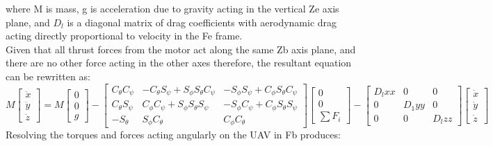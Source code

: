 \documentclass[12pt,a4paper,twoside]{report}
\begin{document}
				where M is mass, g is acceleration due to gravity acting in the vertical Ze axis plane, and \(D_l\) is a diagonal matrix of drag coefficients with aerodynamic drag acting directly proportional to velocity in the Fe frame.
				\\
				Given that all thrust forces from the motor act along the same Zb axis plane, and there are no other force acting in the other axes therefore, the resultant equation can be rewritten as:
				\\
				\begin{equation}
					M 
					\begin{bmatrix}
						\ddot{x} \\
						\ddot{y} \\
						\ddot{z}
					\end{bmatrix}
					=
					M 
					\begin{bmatrix}
						0 \\
						0 \\
						g
					\end{bmatrix}
					-
					\begin{bmatrix}
						C_\theta C_\psi & -C_\theta S_\psi + S_\phi S_\theta C_\psi & -S_\phi S_\psi + C_\phi S_\theta C_\psi \\
						C_\theta S_\psi &  C_\phi C_\psi + S_\phi S_\theta S_\psi   & -S_\phi C_\psi + C_\phi S_\theta S_\psi \\
						-S_\theta       &  S_\phi C_\theta                          &  C_\phi C_\theta
					\end{bmatrix}
					\begin{bmatrix}
						0 \\
						0 \\
						\sum F_i 
					\end{bmatrix}
					-
					\begin{bmatrix}
						D_lxx & 0 & 0 \\
						0 & D_1yy & 0 \\
						0 & 0 & D_lzz
					\end{bmatrix}
					\begin{bmatrix}
						\dot{x} \\
						\dot{y} \\
						\dot{z} 
					\end{bmatrix}
				\end{equation}  
				Resolving the torques and forces acting angularly on the UAV in Fb produces:
				\\
\end{document}
